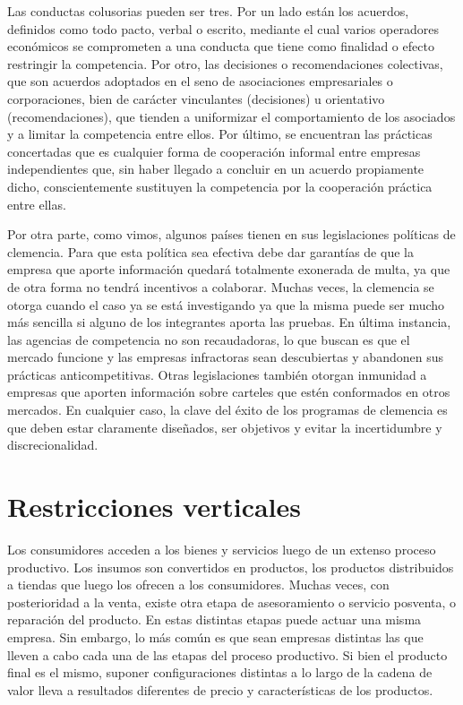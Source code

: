 \documentclass[
  12pt,
  spanish,
]{book}
\begin{document}
Las conductas colusorias pueden ser tres. Por un lado están los
acuerdos, definidos como todo pacto, verbal o escrito, mediante el cual
varios operadores económicos se comprometen a una conducta que tiene
como finalidad o efecto restringir la competencia. Por otro, las
decisiones o recomendaciones colectivas, que son acuerdos adoptados en
el seno de asociaciones empresariales o corporaciones, bien de carácter
vinculantes (decisiones) u orientativo (recomendaciones), que tienden a
uniformizar el comportamiento de los asociados y a limitar la
competencia entre ellos. Por último, se encuentran las prácticas
concertadas que es cualquier forma de cooperación informal entre
empresas independientes que, sin haber llegado a concluir en un acuerdo
propiamente dicho, conscientemente sustituyen la competencia por la
cooperación práctica entre ellas.

Por otra parte, como vimos, algunos países tienen en sus legislaciones
políticas de clemencia. Para que esta política sea efectiva debe dar
garantías de que la empresa que aporte información quedará totalmente
exonerada de multa, ya que de otra forma no tendrá incentivos a
colaborar. Muchas veces, la clemencia se otorga cuando el caso ya se
está investigando ya que la misma puede ser mucho más sencilla si alguno
de los integrantes aporta las pruebas. En última instancia, las agencias
de competencia no son recaudadoras, lo que buscan es que el mercado
funcione y las empresas infractoras sean descubiertas y abandonen sus
prácticas anticompetitivas. Otras legislaciones también otorgan
inmunidad a empresas que aporten información sobre carteles que estén
conformados en otros mercados. En cualquier caso, la clave del éxito de
los programas de clemencia es que deben estar claramente diseñados, ser
objetivos y evitar la incertidumbre y discrecionalidad.

\hypertarget{rest-vert}{%
\section{Restricciones verticales}\label{rest-vert}}

Los consumidores acceden a los bienes y servicios luego de un extenso
proceso productivo. Los insumos son convertidos en productos, los
productos distribuidos a tiendas que luego los ofrecen a los
consumidores. Muchas veces, con posterioridad a la venta, existe otra
etapa de asesoramiento o servicio posventa, o reparación del producto.
En estas distintas etapas puede actuar una misma empresa. Sin embargo,
lo más común es que sean empresas distintas las que lleven a cabo cada
una de las etapas del proceso productivo. Si bien el producto final es
el mismo, suponer configuraciones distintas a lo largo de la cadena de
valor lleva a resultados diferentes de precio y características de los
productos.
\end{document}
